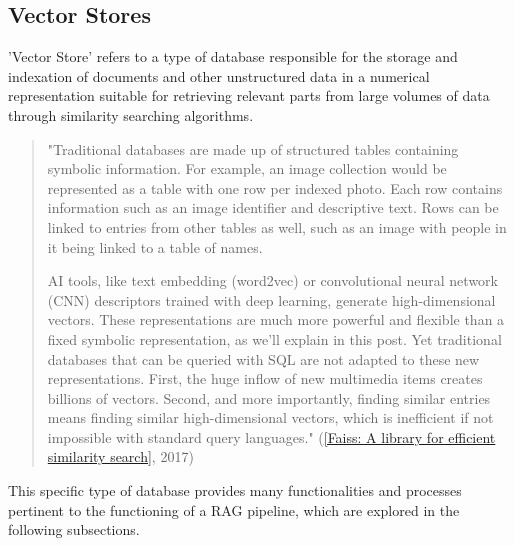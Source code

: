 \subsection{Vector Stores}
'Vector Store' refers to a type of database responsible for the storage and indexation of documents and other unstructured data in a numerical representation suitable for retrieving relevant parts from large volumes of data through similarity searching algorithms.
\begin{quote}
    "Traditional databases are made up of structured tables containing symbolic information. For example, an image collection would be represented as a table with one row per indexed photo. Each row contains information such as an image identifier and descriptive text. Rows can be linked to entries from other tables as well, such as an image with people in it being linked to a table of names.

    AI tools, like text embedding (word2vec) or convolutional neural network (CNN) descriptors trained with deep learning, generate high-dimensional vectors. These representations are much more powerful and flexible than a fixed symbolic representation, as we’ll explain in this post. Yet traditional databases that can be queried with SQL are not adapted to these new representations. First, the huge inflow of new multimedia items creates billions of vectors. Second, and more importantly, finding similar entries means finding similar high-dimensional vectors, which is inefficient if not impossible with standard query languages."  (\href{https://engineering.fb.com/2017/03/29/data-infrastructure/faiss-a-library-for-efficient-similarity-search/}{[Faiss: A library for efficient similarity search]}, 2017)
\end{quote}
This specific type of database provides many functionalities and processes pertinent to the functioning of a RAG pipeline, which are explored in the following subsections.
